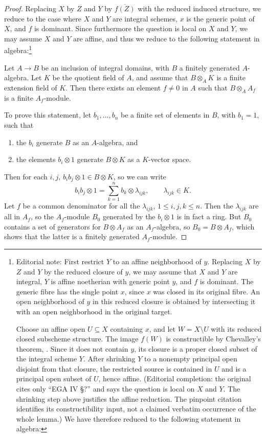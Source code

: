 \begin{proof}
Replacing $X$ by $Z$ and $Y$ by $\overline{f(Z)}$ with the reduced induced structure, we reduce to the case where $X$ and $Y$ are integral schemes, $x$ is the generic point of $X$, and $f$ is dominant. Since furthermore the question is local on $X$ and $Y$, we may assume $X$ and $Y$ are affine, and thus we reduce to the following statement in algebra:\footnote{Editorial note: First restrict $Y$ to an affine neighborhood of $y$. Replacing $X$ by $Z$ and $Y$ by the reduced closure of $y$, we may assume that $X$ and $Y$ are integral, $Y$ is affine noetherian with generic point $y$, and $f$ is dominant. The generic fibre has the single point $x$, since $x$ was closed in its original fibre. An open neighborhood of $y$ in this reduced closure is obtained by intersecting it with an open neighborhood in the original target.\par
Choose an affine open $U\subseteq X$ containing $x$, and let $W=X\setminus U$ with its reduced closed subscheme structure. The image $f(W)$ is constructible by Chevalley's theorem, \cite[\nopp IV,~1.8.5]{EGA}. Since it does not contain $y$, its closure is a proper closed subset of the integral scheme $Y$. After shrinking $Y$ to a nonempty principal open disjoint from that closure, the restricted source is contained in $U$ and is a principal open subset of $U$, hence affine. (Editorial completion: the original cites only ``EGA IV \S?'' and says the question is local on $X$ and $Y$. The shrinking step above justifies the affine reduction. The pinpoint citation identifies its constructibility input, not a claimed verbatim occurrence of the whole lemma.) We have therefore reduced to the following statement in algebra:}

Let $A\to B$ be an inclusion of integral domains, with $B$ a finitely generated $A$-algebra. Let $K$ be the quotient field of $A$, and assume that $B\otimes_A K$ is a finite extension field of $K$. Then there exists an element $f\neq0$ in $A$ such that $B\otimes_A A_f$ is a finite $A_f$-module.

To prove this statement, let $b_1,\dots,b_n$ be a finite set of elements in $B$, with $b_1=1$, such that
\begin{enumerate}
\item[1)] the $b_i$ generate $B$ as an $A$-algebra, and
\item[2)] the elements $b_i\otimes 1$ generate $B\otimes K$ as a $K$-vector space.
\end{enumerate}
Then for each $i,j$, $b_i b_j\otimes 1 \in B\otimes K$, so we can write
\[
b_i b_j \otimes 1 = \sum_{k=1}^{n} b_k \otimes \lambda_{ijk},\qquad \lambda_{ijk}\in K.
\]
Let $f$ be a common denominator for all the $\lambda_{ijk}$, $1\leq i,j,k\leq n$. Then the $\lambda_{ijk}$ are all in $A_f$, so the $A_f$-module $B_0$ generated by the $b_i\otimes 1$ is in fact a ring. But $B_0$ contains a set of generators for $B\otimes A_f$ as an $A_f$-algebra, so $B_0 = B\otimes A_f$, which shows that the latter is a finitely generated $A_f$-module.
\end{proof}

